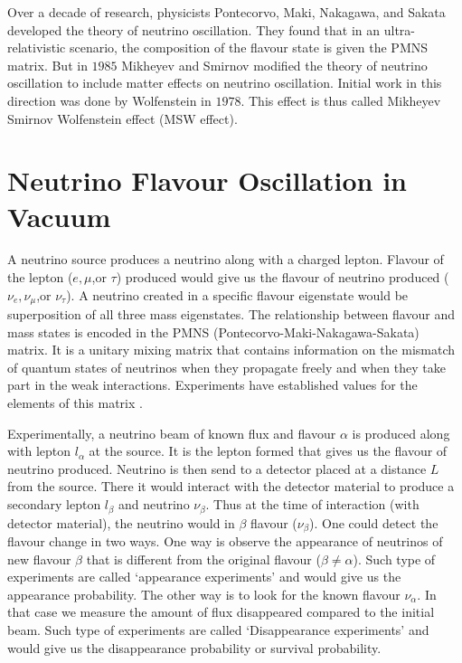 \documentclass[12pt,a4paper]{report}
\begin{document}
Over a decade of research, physicists Pontecorvo, Maki, Nakagawa, and Sakata developed the theory of neutrino oscillation. They found that in an ultra-relativistic scenario, the composition of the flavour state is given the PMNS matrix. But in $1985$ Mikheyev and Smirnov modified the theory of neutrino oscillation to include matter effects on neutrino oscillation. Initial work in this direction was done by Wolfenstein in $1978$. This effect is thus called Mikheyev Smirnov Wolfenstein effect (MSW effect). 

\section{Neutrino Flavour Oscillation in Vacuum}\label{FO}
A neutrino source produces a neutrino along with a charged lepton. Flavour of the lepton ($e,\mu$,or $\tau$) produced would give us the flavour of neutrino produced ($\nu_{e},\nu_{\mu}$,or $\nu_{\tau}$). A neutrino created in a specific flavour eigenstate would be superposition of all three mass eigenstates. The relationship between flavour and mass states is encoded in the PMNS (Pontecorvo-Maki-Nakagawa-Sakata) matrix. It is a unitary mixing matrix that contains information on the mismatch of quantum states of neutrinos when they propagate freely and when they take part in the weak interactions. Experiments have established values for the elements of this matrix \cite{zyla}.\par
Experimentally, a neutrino beam of known flux and flavour $\alpha$ is produced along with lepton $l_{\alpha}$ at the source. It is the lepton formed that gives us the flavour of neutrino produced. Neutrino is then send to a detector placed at a distance $L$ from the source. There it would interact with the detector material to produce a secondary lepton $l_{\beta}$ and neutrino $\nu_{\beta}$.  Thus at the time of interaction (with detector material), the neutrino would in $\beta$ flavour ($\nu_{\beta}$). One could detect the flavour change in two ways. One way is observe the appearance of neutrinos of new flavour $\beta$ that is different from the original flavour ($\beta\neq\alpha$). Such type of experiments are called `appearance experiments' and would give us the appearance probability. The other way is to look for the known flavour $\nu_{\alpha}$. In that case we measure the amount of flux disappeared compared to the initial beam. Such type of experiments are called `Disappearance experiments' and would give us the disappearance probability or survival probability.
\end{document}
